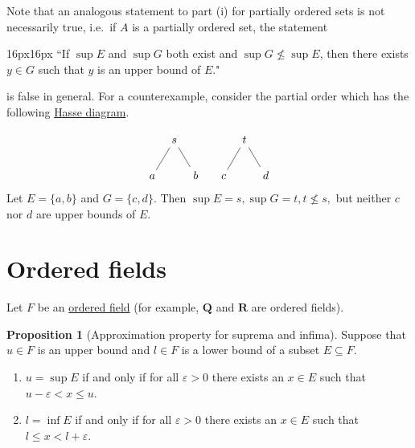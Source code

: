 \documentclass[12pt]{article}
\theoremstyle{definition}
\newtheorem{proposition}[definition]{Proposition}
\newcommand{\Q}{\mathbf{Q}}
\newcommand{\R}{\mathbf{R}}
\begin{document}
Note that an analogous statement to part (i) for partially ordered sets is not necessarily true, i.e.\ if \( A \) is a partially ordered set, the statement

\vspace{6px}
\begin{adjustwidth}{16px}{16px}
    ``If \( \sup E \) and \( \sup G \) both exist and \( \sup G \not\leq \sup E \), then there exists \( y \in G \) such that \( y \) is an upper bound of \( E \)."
\end{adjustwidth}
\vspace{6px}

\noindent is false in general. For a counterexample, consider the partial order which has the following \href{https://en.wikipedia.org/wiki/Hasse_diagram}{Hasse diagram}.

\[
\begin{tikzcd}[column sep = tiny]
    & s & & & & t & \\
    a \arrow[ru, no head] & & b \arrow[lu, no head] & & c \arrow[ru, no head] & & d \arrow[lu, no head]
\end{tikzcd}
\]
Let \( E = \{ a, b \} \) and \( G = \{ c, d \} \). Then \( \sup E = s, \sup G = t, t \not\leq s, \) but neither \( c \) nor \( d \) are upper bounds of \( E \).


\section{Ordered fields}
\label{sec:ordered_fields}

Let \( F \) be an \href{https://en.wikipedia.org/wiki/Ordered_field}{ordered field} (for example, \( \Q \) and \( \R \) are ordered fields).

\begin{proposition}[Approximation property for suprema and infima]
\label{prop:approximation_property}
    Suppose that \( u \in F \) is an upper bound and \( l \in F \) is a lower bound of a subset \( E \subseteq F \).

    \begin{enumerate}[label = (\roman*)]
        \item \( u = \sup E \) if and only if for all \( \varepsilon > 0 \) there exists an \( x \in E \) such that \( u - \varepsilon < x \leq u \).

        \item \( l = \inf E \) if and only if for all \( \varepsilon > 0 \) there exists an \( x \in E \) such that \( l \leq x < l + \varepsilon \).
    \end{enumerate}
\end{proposition}
\end{document}
